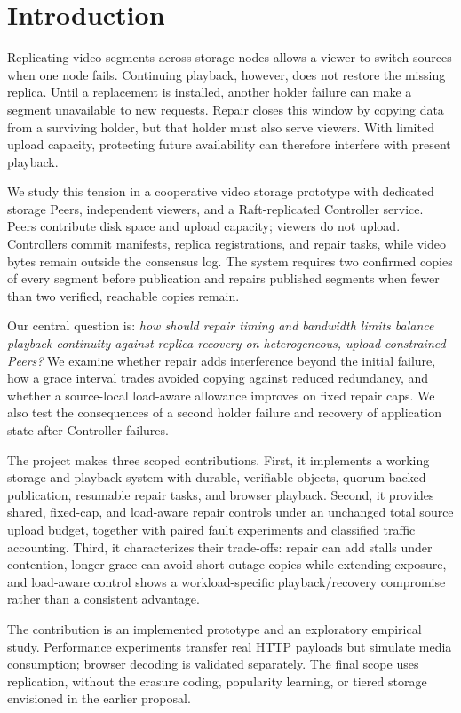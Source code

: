 \section{Introduction}
Replicating video segments across storage nodes allows a viewer to switch
sources when one node fails. Continuing playback, however, does not restore
the missing replica. Until a replacement is installed, another holder failure
can make a segment unavailable to new requests. Repair closes this window by
copying data from a surviving holder, but that holder must also serve viewers.
With limited upload capacity, protecting future availability can therefore
interfere with present playback.

We study this tension in a cooperative video storage prototype with dedicated
storage Peers, independent viewers, and a Raft-replicated Controller service.
Peers contribute disk space and upload capacity; viewers do not upload.
Controllers commit manifests, replica registrations, and repair tasks, while
video bytes remain outside the consensus log. The system requires two
confirmed copies of every segment before publication and repairs published
segments when fewer than two verified, reachable copies remain.

Our central question is: \emph{how should repair timing and bandwidth limits
balance playback continuity against replica recovery on heterogeneous,
upload-constrained Peers?} We examine whether repair adds interference beyond
the initial failure, how a grace interval trades avoided copying against
reduced redundancy, and whether a source-local load-aware allowance improves
on fixed repair caps. We also test the consequences of a second holder
failure and recovery of application state after Controller failures.

The project makes three scoped contributions. First, it implements a working
storage and playback system with durable, verifiable objects, quorum-backed
publication, resumable repair tasks, and browser playback. Second, it provides
shared, fixed-cap, and load-aware repair controls under an unchanged total
source upload budget, together with paired fault experiments and classified
traffic accounting. Third, it characterizes their trade-offs: repair can add
stalls under contention, longer grace can avoid short-outage copies while
extending exposure, and load-aware control shows a workload-specific
playback/recovery compromise rather than a consistent advantage.

The contribution is an implemented prototype and an exploratory empirical
study. Performance experiments transfer real HTTP payloads but simulate
media consumption; browser decoding is validated separately. The final scope
uses replication, without the erasure coding, popularity learning, or tiered
storage envisioned in the earlier proposal.
